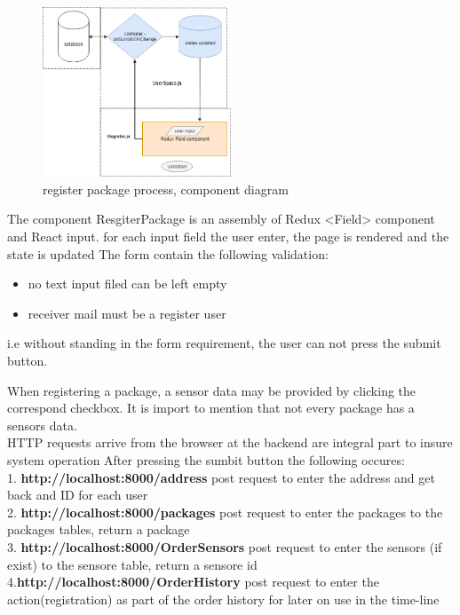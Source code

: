 \begin{figure}[!ht]
	\centering
	\includegraphics[width=0.5\textwidth]{images/register.jpg}
	\caption{register package process, component diagram}
	\label{fig:}
\end{figure}


The component ResgiterPackage is an assembly of Redux <Field> component and React input.
for each input field the user enter, the page is rendered and the state is updated
The form contain the following validation:
\begin{itemize}
\item no text input filed can be left empty 
\item receiver mail must be a register user
\end{itemize}
i.e without standing in the form requirement, the user can not press the submit button.

When registering a package, a sensor data may be provided by clicking the correspond checkbox. It is import to mention that not every package has a sensors data.\\
HTTP requests arrive from the browser at the backend are integral part to insure system operation
After pressing the sumbit button the following occures:\\
1. \textbf{http://localhost:8000/address} post request to enter the address and get back and ID for each user\\
2. \textbf {http://localhost:8000/packages}  post request to enter the packages to the packages tables, return a package \\
3. \textbf {http://localhost:8000/OrderSensors}  post request to enter the sensors (if exist)  to the sensore table, return a sensore id\\
4.\textbf {http://localhost:8000/OrderHistory}  post request to enter the action(registration) as part of the order history for later on use in the time-line\\

